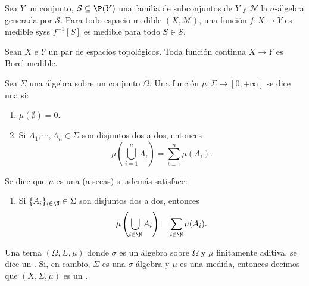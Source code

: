 \begin{prop}
	Sea $Y$ un conjunto, $\mathcal{S} \subseteq \P(Y)$ una familia de subconjuntos de $Y$ y $\mathscr{N}$ la $\sigma$-álgebra generada por $\mathcal{S}$.
	Para todo espacio medible $(X, \mathscr{M})$, una función $f \colon X \to Y$ es medible syss $f^{-1}[S]$ es medible para todo $S \in \mathcal{S}$.
\end{prop}
\begin{cor}
	Sean $X$ e $Y$ un par de espacios topológicos.
	Toda función continua $X \to Y$ es Borel-medible.
\end{cor}

\begin{mydefi}
	Sea $\Sigma$ una álgebra sobre un conjunto $\Omega$.
	Una función $\mu\colon \Sigma \to [0,+\infty]$ se dice una  si:
	\begin{enumerate}[{MF}1.]
		\item $\mu(\emptyset) = 0$.
		\item Si $A_1,\cdots,A_n \in \Sigma$ son disjuntos dos a dos, entonces
			$$ \mu( \bigcup_{i=1}^n A_i ) = \sum_{i=1}^n \mu(A_i). $$
	\end{enumerate}
	Se dice que $\mu$ es una  (a secas) si además satisface:
	\begin{enumerate}[resume*]
		\item Si $\{A_i\}_{i\in\N} \in \Sigma$ son disjuntos dos a dos, entonces
			$$ \mu\left( \bigcup_{i\in\N}A_i \right) = \sum_{i\in\N} \mu(A_i). $$
	\end{enumerate}
	Una terna $(\Omega, \Sigma, \mu)$ donde $\sigma$ es un álgebra sobre $\Omega$ y $\mu$ finitamente aditiva,
	se dice un . 
	Si, en cambio, $\Sigma$ es una $\sigma$-álgebra y $\mu$ es una medida, entonces decimos que $(X, \Sigma, \mu)$
	es un .
\end{mydefi}

